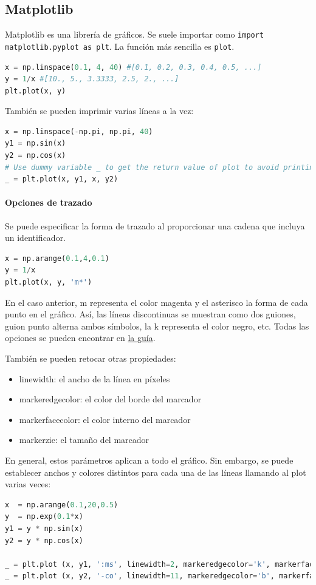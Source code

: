 \subsection{Matplotlib}
Matplotlib es una librería de gráficos. Se suele importar como \texttt{import matplotlib.pyplot as plt}. La función más sencilla es \texttt{plot}.
\begin{lstlisting}[language=Python]
x = np.linspace(0.1, 4, 40) #[0.1, 0.2, 0.3, 0.4, 0.5, ...]
y = 1/x #[10., 5., 3.3333, 2.5, 2., ...]
plt.plot(x, y)
\end{lstlisting}

También se pueden imprimir varias líneas a la vez:
\begin{lstlisting}[language=Python]
x = np.linspace(-np.pi, np.pi, 40) 
y1 = np.sin(x)
y2 = np.cos(x)
# Use dummy variable _ to get the return value of plot to avoid printing its reference
_ = plt.plot(x, y1, x, y2)
\end{lstlisting}

\paragraph{Opciones de trazado}
Se puede especificar la forma de trazado al proporcionar una cadena que incluya un identificador. 
\begin{lstlisting}[language=Python]
x = np.arange(0.1,4,0.1)
y = 1/x
plt.plot(x, y, 'm*')
\end{lstlisting}
En el caso anterior, m representa el color magenta y el asterisco la forma de cada punto en el gráfico. Así, las líneas discontinuas se muestran como dos guiones, guion punto alterna ambos símbolos, la k representa el color negro, etc. Todas las opciones se pueden encontrar en \href{https://matplotlib.org/stable/api/_as_gen/matplotlib.axes.Axes.plot.html#matplotlib.axes.Axes.plot}{la guía}.

También se pueden retocar otras propiedades:
\begin{itemize}
\item linewidth: el ancho de la línea en píxeles
\item markeredgecolor: el color del borde del marcador
\item markerfacecolor: el color interno del marcador
\item markerzie: el tamaño del marcador
\end{itemize}
En general, estos parámetros aplican a todo el gráfico. Sin embargo, se puede establecer anchos y colores distintos para cada una de las líneas llamando al plot varias veces:
\begin{lstlisting}[language=Python]
x  = np.arange(0.1,20,0.5)
y  = np.exp(0.1*x)
y1 = y * np.sin(x)
y2 = y * np.cos(x)

_ = plt.plot (x, y1, ':ms', linewidth=2, markeredgecolor='k', markerfacecolor='r', markersize=5)
_ = plt.plot (x, y2, '-co', linewidth=11, markeredgecolor='b', markerfacecolor='c', markersize=11)
\end{lstlisting}

